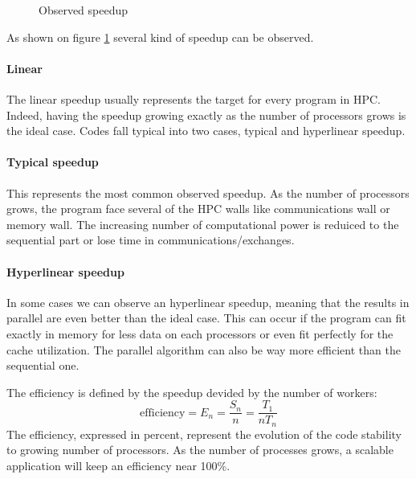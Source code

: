 \begin{figure}
\centering 
{}
\caption{Observed speedup}
\label{fig:1_HPC:speedup_obs}
\end{figure}

As shown on figure \ref{fig:1_HPC:speedup_obs} several kind of speedup can be observed. 
\paragraph{Linear}
The linear speedup usually represents the target for every program in HPC. 
Indeed, having the speedup growing exactly as the number of processors grows is the ideal case. 
Codes fall typical into two cases, typical and hyperlinear speedup. 
\paragraph{Typical speedup}
This represents the most common observed speedup. 
As the number of processors grows, the program face several of the HPC walls like communications wall or memory wall. 
The increasing number of computational power is reduiced to the sequential part or lose time in communications/exchanges. 
\paragraph{Hyperlinear speedup}
In some cases we can observe an hyperlinear speedup, meaning that the results in parallel are even better than the ideal case. 
This can occur if the program can fit exactly in memory for less data on each processors or even fit perfectly for the cache utilization. 
The parallel algorithm can also be way more efficient than the sequential one. 

The efficiency is defined by the speedup devided by the number of workers: 
\begin{equation}
\text{efficiency} = E_n = \frac{S_n}{n} = \frac{T_1}{nT_n}
\end{equation}
The efficiency, expressed in percent, represent the evolution of the code stability to growing number of processors. 
As the number of processes grows, a scalable application will keep an efficiency near 100\%.

